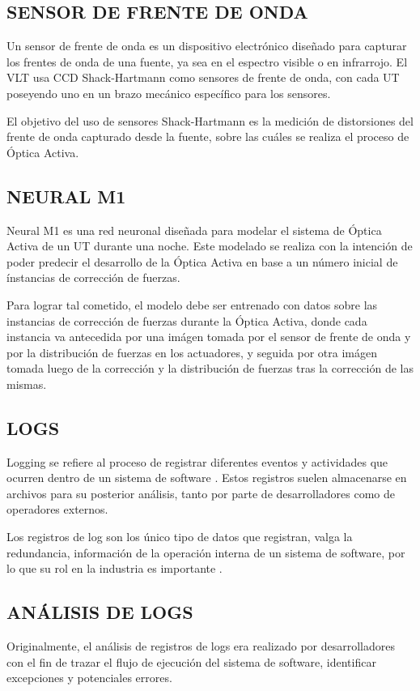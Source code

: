 \subsection{SENSOR DE FRENTE DE ONDA}
Un sensor de frente de onda es un dispositivo electrónico diseñado para capturar los frentes de onda de una fuente, ya sea en el espectro visible o en infrarrojo. El VLT usa CCD Shack-Hartmann como sensores de frente de onda, con cada UT poseyendo uno en un brazo mecánico específico para los sensores.\cite{eso1998vlt}

El objetivo del uso de sensores Shack-Hartmann es la medición de distorsiones del frente de onda capturado desde la fuente, sobre las cuáles se realiza el proceso de Óptica Activa.\cite{eso1998vlt}

\subsection{NEURAL M1}

Neural M1 es una red neuronal diseñada para modelar el sistema de Óptica Activa de un UT durante una noche. Este modelado se realiza con la intención de poder predecir el desarrollo de la Óptica Activa en base a un número inicial de ínstancias de corrección de fuerzas.

Para lograr tal cometido, el modelo debe ser entrenado con datos sobre las instancias de corrección de fuerzas durante la Óptica Activa, donde cada instancia va antecedida por una imágen tomada por el sensor de frente de onda y por la distribución de fuerzas en los actuadores, y seguida por otra imágen tomada luego de la corrección y la distribución de fuerzas tras la corrección de las mismas.

\subsection{LOGS}
Logging se refiere al proceso de registrar diferentes eventos y actividades que ocurren dentro de un sistema de software \cite{jayathilake2011mind}. Estos registros suelen almacenarse en archivos para su posterior análisis, tanto por parte de desarrolladores como de operadores externos.

Los registros de log son los único tipo de datos que registran, valga la redundancia, información de la operación interna de un sistema de software, por lo que su rol en la industria es importante \cite{ma2023automatic}.

\subsection{ANÁLISIS DE LOGS}
Originalmente, el análisis de registros de logs era realizado por desarrolladores con el fin de trazar el flujo de ejecución del sistema de software, identificar excepciones y potenciales errores. \cite{jayathilake2011mind}

